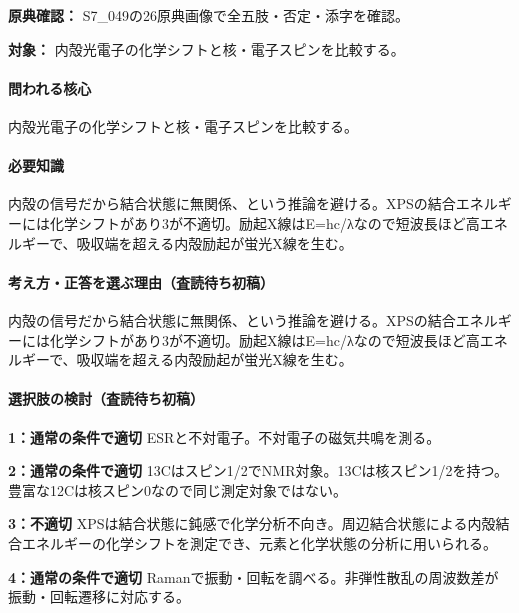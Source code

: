 \noindent\textbf{原典確認：} S7\_049の26原典画像で全五肢・否定・添字を確認。\par

\noindent\textbf{対象：} 内殻光電子の化学シフトと核・電子スピンを比較する。\par

\paragraph{問われる核心} 内殻光電子の化学シフトと核・電子スピンを比較する。

\paragraph{必要知識} 内殻の信号だから結合状態に無関係、という推論を避ける。XPSの結合エネルギーには化学シフトがあり3が不適切。励起X線はE=\allowbreak{}hc/λなので短波長ほど高エネルギーで、吸収端を超える内殻励起が蛍光X線を生む。

\paragraph{考え方・正答を選ぶ理由（査読待ち初稿）} 内殻の信号だから結合状態に無関係、という推論を避ける。XPSの結合エネルギーには化学シフトがあり3が不適切。励起X線はE=\allowbreak{}hc/λなので短波長ほど高エネルギーで、吸収端を超える内殻励起が蛍光X線を生む。

\paragraph{選択肢の検討（査読待ち初稿）}\mbox{}\par

\noindent\textbf{1：通常の条件で適切} ESRと不対電子。不対電子の磁気共鳴を測る。\par

\noindent\textbf{2：通常の条件で適切} 13Cはスピン1/2でNMR対象。13Cは核スピン1/2を持つ。豊富な12Cは核スピン0なので同じ測定対象ではない。\par

\noindent\textbf{3：不適切} XPSは結合状態に鈍感で化学分析不向き。周辺結合状態による内殻結合エネルギーの化学シフトを測定でき、元素と化学状態の分析に用いられる。\par

\noindent\textbf{4：通常の条件で適切} Ramanで振動・回転を調べる。非弾性散乱の周波数差が振動・回転遷移に対応する。\par

